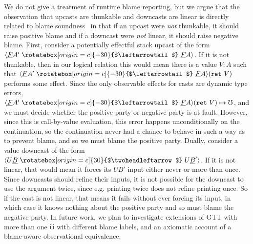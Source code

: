 \documentclass[acmsmall,nonacm]{acmart}
\newif\iflong
\renewcommand{\u}{\underline}
\newcommand{\uarrow}{\mathrel{\rotatebox[origin=c]{-30}{$\leftarrowtail$}}}
\newcommand{\darrow}{\mathrel{\rotatebox[origin=c]{30}{$\twoheadleftarrow$}}}
\newcommand{\upcast}[2]{\langle{#2}\uarrow{#1}\rangle}
\newcommand{\dncast}[2]{\langle{#1}\darrow{#2}\rangle}
\newcommand{\err}{\mho}
\newcommand{\kw}[1]{\texttt{#1}\,\,}
\newcommand{\ret}{\kw{ret}}
\begin{document}
{\iflong \paragraph{Blame}
\fi
We do not give a treatment of runtime blame reporting, but we argue that
the observation that upcasts are thunkable and downcasts are linear is
directly related to blame soundness~\cite{tobin-hochstadt06,wadler-findler09} in that if
an upcast were \emph{not} thunkable, it should raise positive blame and
if a downcast were \emph{not} linear, it should raise negative blame.
%
First, consider a potentially effectful stack upcast of the form
$\upcast{\u F A}{\u F A'}$. If it is not thunkable, then in our logical
relation this would mean there is a value $V : A$ such that $\upcast{\u
  F A}{\u F A'}(\ret V)$ performs some effect.
%
Since the only observable effects for casts are dynamic type errors, 
$\upcast{\u F A}{\u F A'}(\ret V) \mapsto \err$, and we must decide
whether the positive party or negative party is at fault.
%
However, since this is call-by-value evaluation, this error happens
unconditionally on the continuation, so the continuation never had a
chance to behave in such a way as to prevent blame, and so we must blame the
positive party.
%
Dually, consider a value downcast of the form $\dncast{U \u B}{U \u B'}$.
If it is not linear, that would mean it forces its $U \u B'$
input either never or more than once.
%
Since downcasts should refine their inputs, it is not possible for
the downcast to use the argument twice, since e.g. printing twice does not
refine printing once.
%
So if the cast is not linear, that means it fails without ever forcing
its input, in which case it knows nothing about the positive party and
so must blame the negative party.
%
In future work, we plan to investigate extensions of GTT with more than
one $\err$ with different blame labels, and an axiomatic account of
a blame-aware observational equivalence.



}
\end{document}
